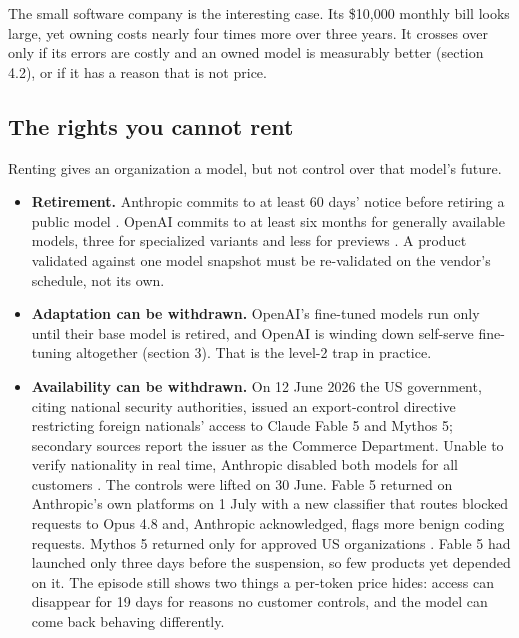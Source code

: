 The small software company is the interesting case. Its \$10,000 monthly bill looks large, yet owning costs nearly four times more over three years. It crosses over only if its errors are costly and an owned model is measurably better (section 4.2), or if it has a reason that is not price.

\subsection{The rights you cannot rent}

Renting gives an organization a model, but not control over that model's future. 

\begin{itemize}
\tightlist
\item
  \textbf{Retirement.} Anthropic commits to at least 60 days' notice before retiring a public model \citep{anthropic2026deprecations}. OpenAI commits to at least six months for generally available models, three for specialized variants and less for previews \citep{openai2026deprecations}. A product validated against one model snapshot must be re-validated on the vendor's schedule, not its own.
\item
  \textbf{Adaptation can be withdrawn.} OpenAI's fine-tuned models run only until their base model is retired, and OpenAI is winding down self-serve fine-tuning altogether (section 3). That is the level-2 trap in practice.
\item
  \textbf{Availability can be withdrawn.} On 12 June 2026 the US government, citing national security authorities, issued an export-control directive restricting foreign nationals' access to Claude Fable 5 and Mythos 5; secondary sources report the issuer as the Commerce Department. Unable to verify nationality in real time, Anthropic disabled both models for all customers \citep{anthropic2026fable}. The controls were lifted on 30 June. Fable 5 returned on Anthropic's own platforms on 1 July with a new classifier that routes blocked requests to Opus 4.8 and, Anthropic acknowledged, flags more benign coding requests. Mythos 5 returned only for approved US organizations \citep{anthropic2026redeploy}. Fable 5 had launched only three days before the suspension, so few products yet depended on it. The episode still shows two things a per-token price hides: access can disappear for 19 days for reasons no customer controls, and the model can come back behaving differently.
\end{itemize}

